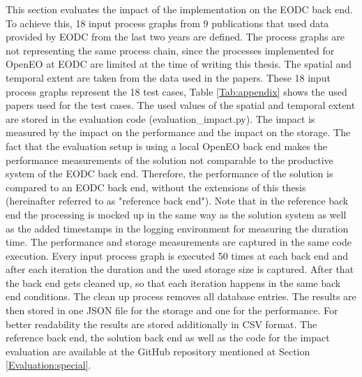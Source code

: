 \documentclass[draft,final]{vutinfth} %
\begin{document}
This section evaluates the impact of the implementation on the EODC back end. To achieve this, 18 input process graphs from 9 publications that used data provided by EODC from the last two years are defined. The process graphs are not representing the same process chain, since the processes implemented for OpenEO at EODC are limited at the time of writing this thesis. The spatial and temporal extent are taken from the data used in the papers. These 18 input process graphs represent the 18 test cases, Table \ref{Tab:appendix} shows the used papers used for the test cases. The used values of the spatial and temporal extent are stored in the evaluation code (evaluation\_impact.py). The impact is measured by the impact on the performance and the impact on the storage. The fact that the evaluation setup is using a local OpenEO back end makes the performance measurements of the solution not comparable to the productive system of the EODC back end. Therefore, the performance of the solution is compared to an EODC back end, without the extensions of this thesis (hereinafter referred to as "reference back end"). Note that in the reference back end the processing is mocked up in the same way as the solution system as well as the added timestamps in the logging environment for measuring the duration time. The performance and storage measurements are captured in the same code execution. Every input process graph is executed 50 times at each back end and after each iteration the duration and the used storage size is captured. After that the back end gets cleaned up, so that each iteration happens in the same back end conditions. The clean up process removes all database entries. The results are then stored in one JSON file for the storage and one for the performance. For better readability the results are stored additionally in CSV format. The reference back end, the solution back end as well as the code for the impact evaluation are available at the GitHub repository mentioned at Section \ref{Evaluation:special}.      
\end{document}
